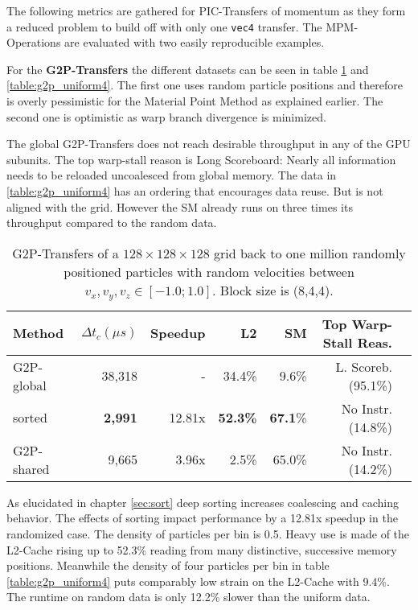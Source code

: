 \documentclass[m,times]{cgMA}
\begin{document}
The following metrics are gathered for PIC-Transfers of momentum as they form a reduced problem to build off with only one \texttt{vec4} transfer. The MPM-Operations are evaluated with two easily reproducible examples.

For the \textbf{G2P-Transfers} the different datasets can be seen in table \ref{table:g2p_random} and \ref{table:g2p_uniform4}. The first one uses random particle positions and therefore is overly pessimistic for the Material Point Method as explained earlier. The second one is optimistic as warp branch divergence is minimized.

The global G2P-Transfers does not reach desirable throughput in any of the GPU subunits. The top warp-stall reason is Long Scoreboard: Nearly all information needs to be reloaded uncoalesced from global memory. The data in \ref{table:g2p_uniform4} has an ordering that encourages data reuse. But is not aligned with the grid. However the SM already runs on three times its throughput compared to the random data.

\begin{table}[htpb]
  \begin{tabular}{ | l | r | r | r | r | r |r|}    \hline
    Method                 &  $\Delta t_c(\mu s)$ &Speedup         & L2    &SM     &Top Warp-Stall Reas. \\\hline
    G2P-global             &   38,318             &-               &34.4\% & 9.6\% &L. Scoreb.(95.1\%)  \\\hline
    sorted                 &    \textbf{2,991}    &12.81x          &\textbf{52.3\%}&\textbf{67.1}\% &No Instr.(14.8\%)   \\\hline
    G2P-shared             &    9,665             & 3.96x          & 2.5\% &65.0\% &No Instr.(14.2\%)\\\hline
 \end{tabular}
 \caption{G2P-Transfers of a $128\times 128\times128$ grid back to one million randomly positioned particles with random velocities between $v_x,v_y,v_z \in [-1.0;1.0]$. Block size is (8,4,4).}\label{table:g2p_random}
\end{table}

As elucidated in chapter \ref{sec:sort} deep sorting increases coalescing and caching behavior. The effects of sorting impact performance by a 12.81x speedup in the randomized case. The density of particles per bin is 0.5. Heavy use is made of the L2-Cache rising up to 52.3\% reading from many distinctive, successive memory positions. Meanwhile the density of four particles per bin in table \ref{table:g2p_uniform4} puts comparably low strain on the L2-Cache with 9.4\%. The runtime on random data is only 12.2\% slower than the uniform data.
\end{document}
